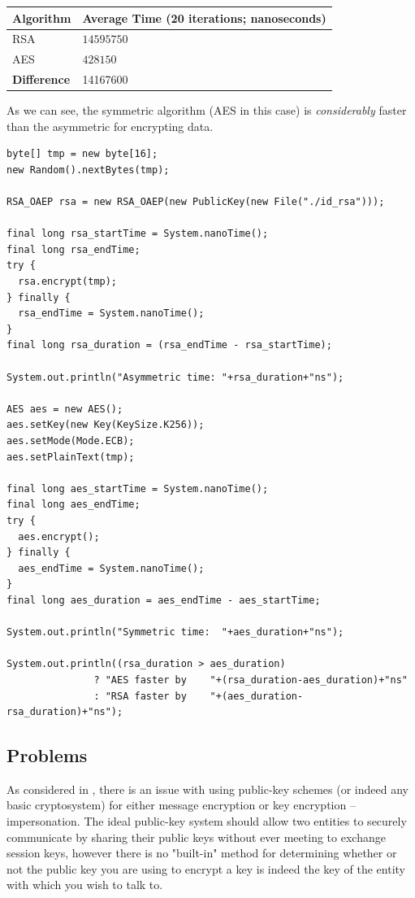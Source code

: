 \begin{center}
    \begin{tabular}{ | l | l |}
    \hline
    	Algorithm & Average Time (20 iterations; nanoseconds) \\ \hline \hline
    	RSA & $14595750$ \\ \hline
    	AES & $428150$ \\ \hline \hline
    	\textbf{Difference} & 14167600  \\
    \hline
    \end{tabular}
\end{center}

As we can see, the symmetric algorithm (AES in this case) is \emph{considerably} faster than the asymmetric for encrypting data. \\

\begin{lstlisting}
byte[] tmp = new byte[16];
new Random().nextBytes(tmp);

RSA_OAEP rsa = new RSA_OAEP(new PublicKey(new File("./id_rsa")));

final long rsa_startTime = System.nanoTime();
final long rsa_endTime;
try {
  rsa.encrypt(tmp);
} finally {
  rsa_endTime = System.nanoTime();
}
final long rsa_duration = (rsa_endTime - rsa_startTime);

System.out.println("Asymmetric time: "+rsa_duration+"ns");

AES aes = new AES();
aes.setKey(new Key(KeySize.K256));
aes.setMode(Mode.ECB);
aes.setPlainText(tmp);

final long aes_startTime = System.nanoTime();
final long aes_endTime;
try {
  aes.encrypt();
} finally {
  aes_endTime = System.nanoTime();
}
final long aes_duration = aes_endTime - aes_startTime;

System.out.println("Symmetric time:  "+aes_duration+"ns");

System.out.println((rsa_duration > aes_duration)
               ? "AES faster by    "+(rsa_duration-aes_duration)+"ns"
               : "RSA faster by    "+(aes_duration-rsa_duration)+"ns");
\end{lstlisting}

\subsection{Problems}

As considered in \emph{}, there is an issue with using public-key schemes (or indeed any basic cryptosystem) for either message encryption or key encryption -- impersonation. The ideal public-key system should allow two entities to securely communicate by sharing their public keys without ever meeting to exchange session keys, however there is no "built-in" method for determining whether or not the public key you are using to encrypt a key is indeed the key of the entity with which you wish to talk to. 

